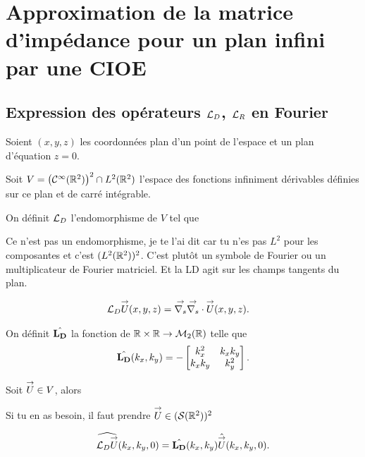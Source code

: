 \section{Approximation de la matrice d'impédance pour un plan infini par une CIOE}

  \subsection[Expression des opérateurs LD, LR en Fourier]{Expression des opérateurs \({\mathcal{L}_D}\), \({\mathcal{L}_R}\) en Fourier}
    \label{sec:plan:hoibc:LD-LR}
    Soient \((x,y,z)\) les coordonnées plan d'un point de l'espace et un plan d'équation \(z=0\).

    Soit \(V = \left(\mathcal{C}^\infty(\mathbb R^2)\right)^2 \cap L^2(\mathbb R^2)\) l'espace des fonctions infiniment dérivables définies sur ce plan et de carré intégrable.

    \begin{defn}
      \label{eq:plan:fourier:LD}
      On définit \({\mathcal{L}_D}\) l'endomorphisme de \(V\) tel que
      \begin{REM}
        Ce n'est pas un endomorphisme, je te l'ai dit car tu n'es pas \(L^2\) pour les composantes et c'est \((L^2(\mathbb R^2))^2\).
        C'est plutôt un symbole de Fourier ou un multiplicateur de Fourier matriciel.
        Et la LD agit sur les champs tangents du plan.
      \end{REM}
      \begin{align*}
        {\mathcal{L}_D} {\overset{\rightarrow}{U}}(x,y,z) & = {\overset{\rightarrow}{\nabla_s}}{} {\overset{\rightarrow}{\nabla_s}} \cdot{} {\overset{\rightarrow}{U}}(x,y,z).
      \end{align*}

      On définit \(\hat{\mathbf{L_D}}\) la fonction de \(\mathbb R\times\mathbb R \rightarrow \mathcal{M}_2(\mathbb R)\) telle que
      \begin{equation*}
        \hat{\mathbf{L_D}}(k_x,k_y) = -
        \begin{bmatrix}
          k_x^2 & k_xk_y
          \\
          k_xk_y & k_y^2
        \end{bmatrix}.
      \end{equation*}
    \end{defn}

    \begin{prop}
      Soit \({\overset{\rightarrow}{U}} \in V\), alors
      \begin{REM}
        Si tu en as besoin, il faut prendre \({\overset{\rightarrow}{U}}\in (\mathcal{S}(\mathbb R^2))^2\)
      \end{REM}
      \begin{equation*}
        \widehat{{\mathcal{L}_D} {\overset{\rightarrow}{U}}} (k_x,k_y,0) = \hat{\mathbf{L_D}}(k_x,k_y) \hat{{\overset{\rightarrow}{U}}}(k_x,k_y,0).
      \end{equation*}
    \end{prop}

